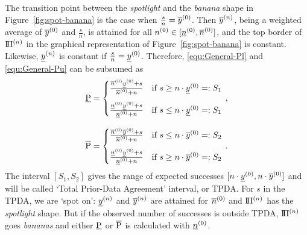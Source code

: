 The transition point between the \emph{spotlight} and the \emph{banana} shape in Figure~\ref{fig:spot-banana}
is the case when $\frac{s}{n} = \overline{y}^{(0)}$. Then $\overline{y}^{(n)}$, being a weighted average
of $\overline{y}^{(0)}$ and $\frac{s}{n}$, is attained for all $n^{(0)} \in [\underline{n}^{(0)}, \overline{n}^{(0)}]$,
and the top border of $\text{I}\!\Pi^{(n)}$ in the graphical representation of Figure~\ref{fig:spot-banana} is constant.
Likewise, $\underline{y}^{(n)}$ is constant if $\frac{s}{n} = \underline{y}^{(0)}$.
Therefore, \eqref{equ:General-Pl} and \eqref{equ:General-Pu} can be subsumed as
\begin{align*}
\underline{\operatorname{P}} &= \begin{cases} \frac{\overline{n}^{(0)}\underline{y}^{(0)} + s}{\overline{n}^{(0)} + n} & \text{if } s \geq n \cdot \underline{y}^{(0)} =: S_1 \\[2ex]
                     \frac{\underline{n}^{(0)}\underline{y}^{(0)} + s}{\underline{n}^{(0)} + n} & \text{if } s \leq n \cdot \underline{y}^{(0)} =: S_1\end{cases}\,, \\[2ex]
\overline{\operatorname{P}} &= \begin{cases} \frac{\overline{n}^{(0)}\overline{y}^{(0)} + s}{\overline{n}^{(0)} + n} & \text{if } s \leq n \cdot \overline{y}^{(0)} =: S_2 \\[2ex]
                     \frac{\underline{n}^{(0)}\underline{y}^{(0)} + s}{\underline{n}^{(0)} + n} & \text{if } s \geq n \cdot \overline{y}^{(0)} =: S_2 \end{cases}\,.
\end{align*}
The interval $[S_1, S_2]$ gives the range of expected successes $[n \cdot \underline{y}^{(0)}, n \cdot \overline{y}^{(0)}]$ and
will be called `Total Prior-Data Agreement' interval, or TPDA. For $s$ in the TPDA,
we are `spot on': $\underline{y}^{(n)}$ and $\overline{y}^{(n)}$ are attained for $\overline{n}^{(0)}$ and $\text{I}\!\Pi^{(n)}$ has the \emph{spotlight} shape.
But if the observed number of successes is outside TPDA, %
$\text{I}\!\Pi^{(n)}$ goes \emph{bananas} and either $\underline{\operatorname{P}}$ or $\overline{\operatorname{P}}$
is calculated with $\underline{n}^{(0)}$. %

